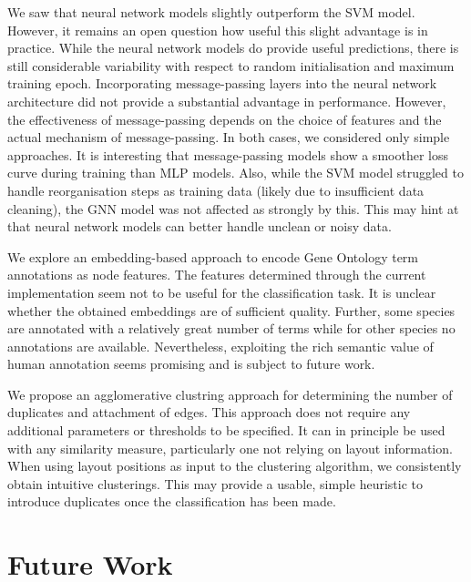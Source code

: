\documentclass[
	fontsize=10pt, %
	twoside=true, %
	secnumdepth=1, %
  toc=indentunnumbered %
]{kaobook}
\begin{document}
We saw that neural network models slightly outperform the SVM model.
However, it remains an open question how useful this slight advantage is in practice.
While the neural network models do provide useful predictions, there is still
considerable variability with respect to random initialisation and maximum
training epoch.
%
Incorporating message-passing layers into the neural network architecture did
not provide a substantial advantage in performance. However, the effectiveness
of message-passing depends on the choice of features and the actual mechanism of
message-passing. In both cases, we considered only simple approaches. 
It is interesting that message-passing models show a smoother loss curve during
training than MLP models.
%
Also, while the SVM model struggled to handle reorganisation steps as training data
(likely due to insufficient data cleaning), the GNN model was not affected as
strongly by this. This may hint at that neural network models can better handle
unclean or noisy data.

We explore an embedding-based approach to encode Gene Ontology term annotations
as node features. The features determined through the current
implementation seem not to be useful for the classification task. It is unclear
whether the obtained embeddings are of sufficient quality. Further, some species
are annotated with a relatively great number of terms while for other species no
annotations are available. Nevertheless, exploiting the rich semantic value of
human annotation seems promising and is subject to future work.

We propose an agglomerative clustring approach for determining the number of
duplicates and attachment of edges. This approach does not require any
additional parameters or thresholds to be specified. It can in principle be used
with any similarity measure, particularly one not relying on layout information.
When using layout positions as input to
the clustering algorithm, we consistently obtain intuitive clusterings.
This may provide a usable, simple heuristic to introduce duplicates
once the classification has been made. 




\section{Future Work}
\label{sec:future-work}

\end{document}
